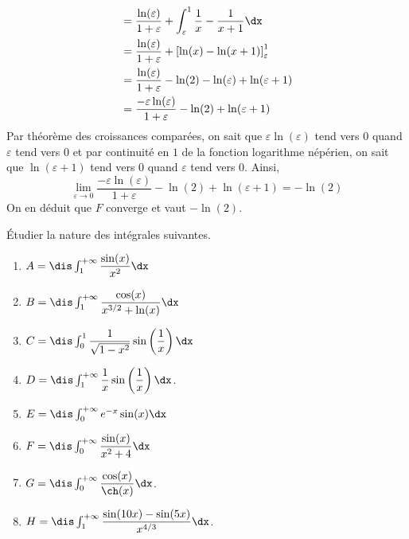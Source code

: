 \documentclass[a4paper,10pt]{report}
\begin{document}
\begin{enumerate}
\begin{align*}
& = \dfrac{\ln(\varepsilon)}{1+\varepsilon} +\int_{\varepsilon}^1 \dfrac{1}{x}- \dfrac{1}{x+1} \dx \\
& = \dfrac{\ln(\varepsilon)}{1+\varepsilon} + \left[\ln(x)- \ln(x+1)\right]_{\varepsilon}^1 \\
& = \dfrac{\ln(\varepsilon)}{1+\varepsilon} - \ln(2) - \ln(\varepsilon)+ \ln(\varepsilon+1) \\
& = \dfrac{-\varepsilon \ln(\varepsilon)}{1+ \varepsilon} - \ln(2) + \ln(\varepsilon+1)
\end{align*}
Par théorème des croissances comparées, on sait que $\varepsilon \ln(\varepsilon)$ tend vers $0$ quand $\varepsilon$ tend vers $0$ et par continuité en $1$ de la fonction logarithme népérien, on sait que $\ln(\varepsilon+1)$ tend vers $0$ quand $\varepsilon$ tend vers $0$. Ainsi,
$$ \lim_{\varepsilon \rightarrow 0} \dfrac{-\varepsilon \ln(\varepsilon)}{1+ \varepsilon} - \ln(2) + \ln(\varepsilon+1) = - \ln(2)$$
On en déduit que $F$ converge et vaut $- \ln(2)$.
\end{enumerate}

\begin{Exercice}{} Étudier la nature des intégrales suivantes. 

\begin{multicols}{2}
\begin{enumerate}
\item $A = \dis \int_1^{+ \infty} \dfrac{\sin(x)}{x^2} \dx$
\item $B = \dis \int_1^{+ \infty} \dfrac{\cos(x)}{x^{3/2}+\ln(x)} \dx$
\item $C = \dis \int_0^{1} \dfrac{1}{\sqrt{1-x^2}} \sin \left(\dfrac{1}{x}\right) \dx$
\item $D= \dis \int_1^{+ \infty} \dfrac{1}{x} \sin \left(\dfrac{1}{x}\right) \dx$.
\item $E= \dis \int_{0}^{+ \infty} e^{-x} \sin(x) \dx$
\item $F= \dis \int_0^{+\infty} \dfrac{\sin(x)}{x^2+4} \dx$
\item $G= \dis \int_0^{+ \infty} \dfrac{\cos(x)}{\ch(x)} \dx$.
\item $H= \dis \int_1^{+\infty} \dfrac{\sin(10x)-\sin(5x)}{x^{4/3}} \dx$.
\end{enumerate}
\end{multicols}
\vspace{0.1cm}
\end{Exercice}

\corr 
\end{document}
